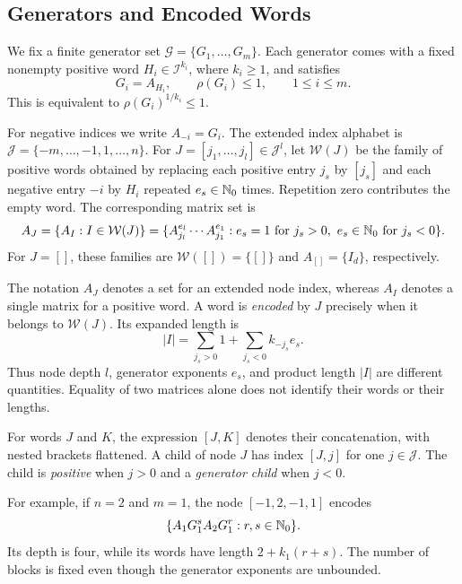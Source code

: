 \subsection{Generators and Encoded Words}

We fix a finite generator set $\mathcal{G}=\{G_1,\dots,G_m\}$.
Each generator comes with a fixed nonempty positive word $H_i\in\mathcal{I}^{k_i}$, where $k_i\geq1$, and satisfies
\[
    G_i=A_{H_i},\qquad \rho(G_i)\leq1,\qquad 1\leq i\leq m.
\]
This is equivalent to $\rho(G_i)^{1/k_i}\leq1$.

\begin{definition}
    \label{def:extendedMultiIndexSet}
    For negative indices we write $A_{-i}=G_i$.
    The extended index alphabet is $\mathcal{J}=\{-m,\dots,-1,1,\dots,n\}$.
    For $J=[j_1,\dots,j_l]\in\mathcal{J}^l$, let $\mathcal{W}(J)$ be the family of positive words obtained by replacing each positive entry $j_s$ by $[j_s]$ and each negative entry $-i$ by $H_i$ repeated $e_s\in\mathbb{N}_0$ times.
    Repetition zero contributes the empty word.
    The corresponding matrix set is
    \[
        A_J=\{A_I:I\in\mathcal{W}(J)\}
        =\{A_{j_l}^{e_l}\cdots A_{j_1}^{e_1}:
        e_s=1\text{ for }j_s>0,\ e_s\in\mathbb{N}_0\text{ for }j_s<0\}.
    \]
    For $J=[]$, these families are $\mathcal{W}([])=\{[]\}$ and $A_{[]}=\{I_d\}$, respectively.
\end{definition}

The notation $A_J$ denotes a set for an extended node index, whereas $A_I$ denotes a single matrix for a positive word.
A word is \emph{encoded} by $J$ precisely when it belongs to $\mathcal{W}(J)$.
Its expanded length is
\[
    |I|=\sum_{j_s>0}1+\sum_{j_s<0}k_{-j_s}e_s.
\]
Thus node depth $l$, generator exponents $e_s$, and product length $|I|$ are different quantities.
Equality of two matrices alone does not identify their words or their lengths.

\begin{definition}
    \label{def:multiIndexExtension}
    For words $J$ and $K$, the expression $[J,K]$ denotes their concatenation, with nested brackets flattened.
    A child of node $J$ has index $[J,j]$ for one $j\in\mathcal{J}$.
    \label{def:childType}
    The child is \emph{positive} when $j>0$ and a \emph{generator child} when $j<0$.
\end{definition}

For example, if $n=2$ and $m=1$, the node $[-1,2,-1,1]$ encodes
\[
    \{A_1G_1^sA_2G_1^r:r,s\in\mathbb{N}_0\}.
\]
Its depth is four, while its words have length $2+k_1(r+s)$.
The number of blocks is fixed even though the generator exponents are unbounded.

